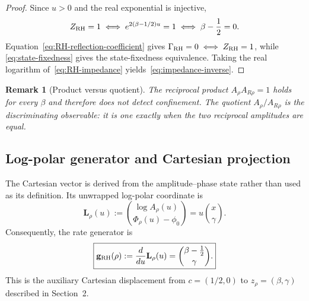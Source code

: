 \documentclass[11pt]{article}
\newtheorem{remark}[definition]{Remark}
\begin{document}
\begin{proof}
Since $u>0$ and the real exponential is injective,
\begin{equation}
 Z_{\rm RH}=1
 \iff e^{2(\beta-1/2)u}=1
 \iff \beta-\frac12=0.
\end{equation}
Equation~\eqref{eq:RH-reflection-coefficient} gives
$\Gamma_{\rm RH}=0\iff Z_{\rm RH}=1$, while
\eqref{eq:state-fixedness} gives the state-fixedness equivalence.  Taking the real logarithm
of~\eqref{eq:RH-impedance} yields~\eqref{eq:impedance-inverse}.
\end{proof}

\begin{remark}[Product versus quotient]\label{rem:product-quotient}
The reciprocal product $A_\rho A_{R\rho}=1$ holds for every $\beta$ and therefore does not
detect confinement.  The quotient $A_\rho/A_{R\rho}$ is the discriminating observable: it is
one exactly when the two reciprocal amplitudes are equal.
\end{remark}

\subsection{Log-polar generator and Cartesian projection}
The Cartesian vector is derived from the amplitude--phase state rather than used as its
definition.  Its unwrapped log-polar coordinate is
\begin{equation}\label{eq:log-polar-linearization}
 \mathbf L_\rho(u):=\binom{\log A_\rho(u)}{\Phi_\rho(u)-\phi_0}
 =u\binom{x}{\gamma}.
\end{equation}
Consequently, the rate generator is
\begin{equation}\label{eq:generator}
 \boxed{\mathbf g_{\rm RH}(\rho)
 :=\frac{d}{du}\mathbf L_\rho(u)
 =\binom{\beta-\tfrac12}{\gamma}.}
\end{equation}
This is the auxiliary Cartesian displacement from $c=(1/2,0)$ to
$z_\rho=(\beta,\gamma)$ described in Section~2.
\end{document}
